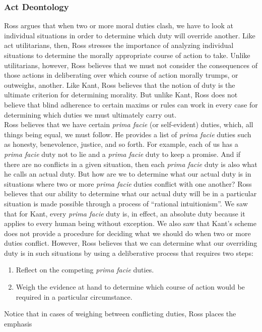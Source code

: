 \documentclass[12pt]{article}
\theoremstyle{definition}
\begin{document}
\subsubsection{Act Deontology}
Ross argues that when two or more moral duties clash, we have to look at individual
situations in order to determine which duty will override another. Like act utilitarians,
then, Ross stresses the importance of analyzing individual situations to determine the
morally appropriate course of action to take. Unlike utilitarians, however, Ross believes
that we must not consider the consequences of those actions in deliberating over which
course of action morally trumps, or outweighs, another. Like Kant, Ross believes that the
notion of duty is the ultimate criterion for determining morality. But unlike Kant, Ross
does not believe that blind adherence to certain maxims or rules can work in every case
for determining which duties we must ultimately carry out.\\
Ross believes that we have certain \textit{prima facie} (or self-evident) duties, which, all
things being equal, we must follow. He provides a list of \textit{prima facie} duties such as
honesty, benevolence, justice, and so forth. For example, each of us has a \textit{prima facie} duty
not to lie and a \textit{prima facie} duty to keep a promise. And if there are no conflicts in a given
situation, then each \textit{prima facie} duty is also what he calls an actual duty. But how are we to
determine what our actual duty is in situations where two or more \textit{prima facie} duties
conflict with one another? Ross believes that our ability to determine what our actual
duty will be in a particular situation is made possible through a process of “rational
intuitionism”.
We saw that for Kant, every \textit{prima facie} duty is, in effect, an absolute duty because it
applies to every human being without exception. We also saw that Kant’s scheme does
not provide a procedure for deciding what we should do when two or more duties conflict.
However, Ross believes that we can determine what our overriding duty is in such
situations by using a deliberative process that requires two steps:
\begin{enumerate}
\item Reflect on the competing \textit{prima facie} duties.
\item Weigh the evidence at hand to determine which course of action would be required in a particular circumstance.
\end{enumerate}
Notice that in cases of weighing between conflicting duties, Ross places the emphasis
\end{document}
